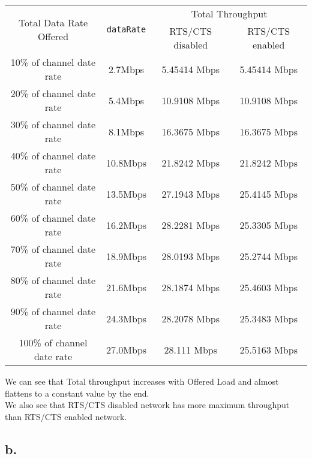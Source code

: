 \documentclass[11pt, fleqn]{article}
\begin{document}
\begin{table}[H]
    \centering
    \begin{tabular}{||c|c||c|c||}
         \hline
         \multirow{2}{*}{Total Data Rate Offered} & \multirow{2}{*}{\texttt{dataRate}} & \multicolumn{2}{c||}{Total Throughput} \\
         & & RTS/CTS disabled & RTS/CTS enabled \\
         \hline %
         10\% of channel date rate & 2.7Mbps & 5.45414 Mbps & 5.45414 Mbps \\
         \hline %
         20\% of channel date rate & 5.4Mbps & 10.9108 Mbps & 10.9108 Mbps \\
         \hline %
         30\% of channel date rate & 8.1Mbps & 16.3675 Mbps & 16.3675 Mbps \\
         \hline %
         40\% of channel date rate & 10.8Mbps & 21.8242 Mbps & 21.8242 Mbps \\
         \hline %
         50\% of channel date rate & 13.5Mbps & 27.1943 Mbps & 25.4145 Mbps \\
         \hline %
         60\% of channel date rate & 16.2Mbps & 28.2281 Mbps & 25.3305 Mbps \\
         \hline %
         70\% of channel date rate & 18.9Mbps & 28.0193 Mbps & 25.2744 Mbps \\
         \hline %
         80\% of channel date rate & 21.6Mbps & 28.1874 Mbps & 25.4603 Mbps \\
         \hline %
         90\% of channel date rate & 24.3Mbps & 28.2078 Mbps & 25.3483 Mbps \\
         \hline %
         100\% of channel date rate & 27.0Mbps & 28.111 Mbps & 25.5163 Mbps \\
         \hline         
    \end{tabular}
\end{table}

We can see that Total throughput increases with Offered Load and almost flattens to a constant value by the end. \\
We also see that RTS/CTS disabled network has more maximum throughput than RTS/CTS enabled network. \\

\subsection*{b.}
\end{document}
